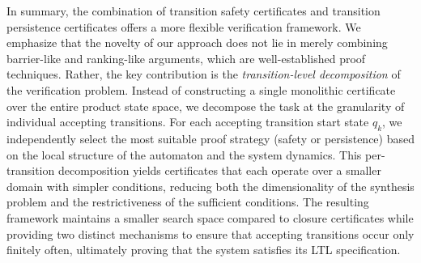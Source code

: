In summary, the combination of transition safety certificates and transition persistence certificates offers a more flexible verification framework. We emphasize that the novelty of our approach does not lie in merely combining barrier-like and ranking-like arguments, which are well-established proof techniques. Rather, the key contribution is the \emph{transition-level decomposition} of the verification problem. Instead of constructing a single monolithic certificate over the entire product state space, we decompose the task at the granularity of individual accepting transitions. For each accepting transition start state $q_k$, we independently select the most suitable proof strategy (safety or persistence) based on the local structure of the automaton and the system dynamics. This per-transition decomposition yields certificates that each operate over a smaller domain with simpler conditions, reducing both the dimensionality of the synthesis problem and the restrictiveness of the sufficient conditions. The resulting framework maintains a smaller search space compared to closure certificates while providing two distinct mechanisms to ensure that accepting transitions occur only finitely often, ultimately proving that the system satisfies its LTL specification.

